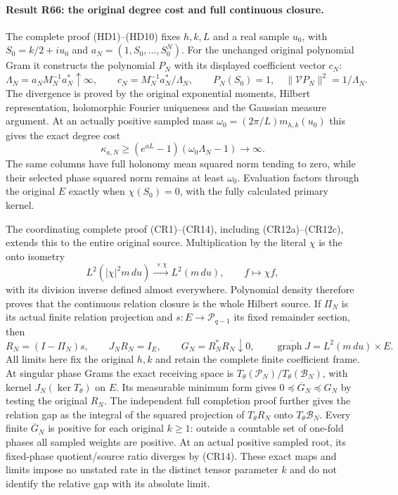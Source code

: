 \paragraph{Result R66: the original degree cost and full continuous closure.}
The complete proof (HD1)--(HD10) fixes $h,k,L$ and a real sample
$u_0$, with $S_0=k/2+iu_0$ and $a_N=(1,S_0,\ldots,S_0^N)$.
For the unchanged original polynomial Gram it constructs the
polynomial $P_N$ with its displayed coefficient vector $c_N$:
\[
 \Lambda_N=a_NM_N^{-1}a_N^*\uparrow\infty,\qquad
 c_N=M_N^{-1}a_N^*/\Lambda_N,
 \qquad P_N(S_0)=1,\quad\|\mathcal V P_N\|^2=1/\Lambda_N.
\]
The divergence is proved by the original exponential moments,
Hilbert representation, holomorphic Fourier uniqueness and the
Gaussian measure argument. At an actually positive sampled mass
$\omega_0=(2\pi/L)m_{h,k}(u_0)$ this gives the exact degree cost
\[
 \kappa_{a,N}\ge(e^{aL}-1)(\omega_0\Lambda_N-1)
       \longrightarrow\infty .
\]
The same columns have full holonomy mean squared norm tending to zero,
while their selected phase squared norm remains at least $\omega_0$.
Evaluation factors through the original $E$ exactly when
$\chi(S_0)=0$, with the fully calculated primary kernel.

The coordinating complete proof (CR1)--(CR14), including (CR12a)--(CR12c),
extends this to the entire original source. Multiplication by the
literal $\chi$ is the onto isometry
\[
 L^2(|\chi|^2m\,du)\xrightarrow{\ \times\chi\ }L^2(m\,du),
 \qquad f\longmapsto\chi f,
\]
with its division inverse defined almost everywhere. Polynomial
density therefore proves that the continuous relation closure is
the whole Hilbert source. If $\Pi_N$ is its actual finite relation
projection and $s:E\to\mathcal P_{q-1}$ its fixed remainder section,
then
\[
 R_N=(I-\Pi_N)s,\qquad J_NR_N=I_E,\qquad
 G_N=R_N^*R_N\downarrow0,
 \qquad\overline{\operatorname{graph}J}=L^2(m\,du)\times E.
\]
All limits here fix the original $h,k$ and retain the complete
finite coefficient frame. At singular phase Grams the exact
receiving space is $T_\theta(\mathcal P_N)/T_\theta(\mathcal B_N)$,
with kernel $J_N(\ker T_\theta)$ on $E$. Its measurable minimum
form gives $0\preceq\overline G_N\preceq G_N$ by testing the
original $R_N$. The independent full completion proof further
gives the relation gap as the integral of the squared projection
of $T_\theta R_N$ onto $T_\theta\mathcal B_N$. Every finite
$\overline G_N$ is positive for each original $k\ge1$: outside
a countable set of one-fold phases all sampled weights are
positive. At an actual positive sampled root, its fixed-phase
quotient/source ratio diverges by (CR14). These exact maps and
limits impose no unstated rate in the distinct tensor parameter
$k$ and do not identify the relative gap with its absolute limit.

